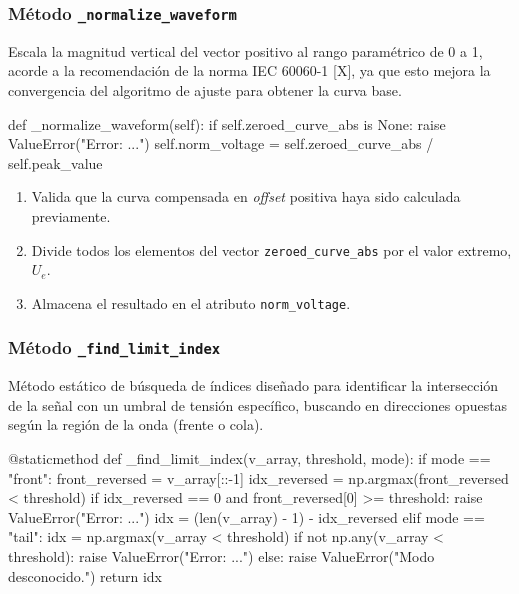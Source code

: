 \subsubsection{Método \texttt{\_normalize\_waveform}}
Escala la magnitud vertical del vector positivo al rango paramétrico de \num{0} a \num{1}, acorde a la recomendación de la norma IEC 60060-1 [X], ya que esto mejora la convergencia del algoritmo de ajuste para obtener la curva base.

\begin{python}
def _normalize_waveform(self):
    if self.zeroed_curve_abs is None:
        raise ValueError("Error: ...")
    self.norm_voltage = self.zeroed_curve_abs / self.peak_value
\end{python}

\begin{enumerate}
    \item Valida que la curva compensada en \textit{offset} positiva haya sido calculada previamente.
    \item Divide todos los elementos del vector \texttt{zeroed\_curve\_abs} por el valor extremo, $U_e$.
    \item Almacena el resultado en el atributo \texttt{norm\_voltage}.
\end{enumerate}

\subsubsection{Método \texttt{\_find\_limit\_index}}
Método estático de búsqueda de índices diseñado para identificar la intersección de la señal con un umbral de tensión específico, buscando en direcciones opuestas según la región de la onda (frente o cola).

\begin{python}
@staticmethod
def _find_limit_index(v_array, threshold, mode):
    if mode == "front":
        front_reversed = v_array[::-1]
        idx_reversed = np.argmax(front_reversed < threshold)
        if idx_reversed == 0 and front_reversed[0] >= threshold:
            raise ValueError("Error: ...")
        idx = (len(v_array) - 1) - idx_reversed
    elif mode == "tail":
        idx = np.argmax(v_array < threshold)
        if not np.any(v_array < threshold):
            raise ValueError("Error: ...")
    else:
        raise ValueError("Modo desconocido.")
    return idx
\end{python}


